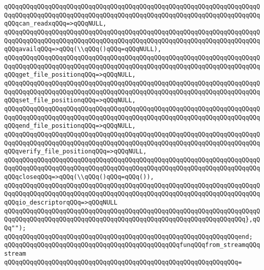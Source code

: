\verb|qQQqqQQqqQQqqQQqqQQqqQQqqQQqqQQqqQQqqQQqqQQqqQQqqQQqqQQqqQQqqQQqqQQqqQQqqQQqqQQqqQQqqQQqqQQqqQQqqQQqqQQqqQQqqQQqqQQqqQQqqQQqqQQqqQQqqQQqqQQqqQQqcan_readxqQQq=>qQQqNULL,|\newline
\verb|qQQqqQQqqQQqqQQqqQQqqQQqqQQqqQQqqQQqqQQqqQQqqQQqqQQqqQQqqQQqqQQqqQQqqQQqqQQqqQQqqQQqqQQqqQQqqQQqqQQqqQQqqQQqqQQqqQQqqQQqqQQqqQQqqQQqqQQqqQQqqQQqavailqQQq=>qQQq(\\qQQq()qQQq=qQQqNULL),|\newline
\verb|qQQqqQQqqQQqqQQqqQQqqQQqqQQqqQQqqQQqqQQqqQQqqQQqqQQqqQQqqQQqqQQqqQQqqQQqqQQqqQQqqQQqqQQqqQQqqQQqqQQqqQQqqQQqqQQqqQQqqQQqqQQqqQQqqQQqqQQqqQQqqQQqget_file_positionqQQq=>qQQqNULL,|\newline
\verb|qQQqqQQqqQQqqQQqqQQqqQQqqQQqqQQqqQQqqQQqqQQqqQQqqQQqqQQqqQQqqQQqqQQqqQQqqQQqqQQqqQQqqQQqqQQqqQQqqQQqqQQqqQQqqQQqqQQqqQQqqQQqqQQqqQQqqQQqqQQqqQQqset_file_positionqQQq=>qQQqNULL,|\newline
\verb|qQQqqQQqqQQqqQQqqQQqqQQqqQQqqQQqqQQqqQQqqQQqqQQqqQQqqQQqqQQqqQQqqQQqqQQqqQQqqQQqqQQqqQQqqQQqqQQqqQQqqQQqqQQqqQQqqQQqqQQqqQQqqQQqqQQqqQQqqQQqqQQqend_file_positionqQQq=>qQQqNULL,|\newline
\verb|qQQqqQQqqQQqqQQqqQQqqQQqqQQqqQQqqQQqqQQqqQQqqQQqqQQqqQQqqQQqqQQqqQQqqQQqqQQqqQQqqQQqqQQqqQQqqQQqqQQqqQQqqQQqqQQqqQQqqQQqqQQqqQQqqQQqqQQqqQQqqQQqverify_file_positionqQQq=>qQQqNULL,|\newline
\verb|qQQqqQQqqQQqqQQqqQQqqQQqqQQqqQQqqQQqqQQqqQQqqQQqqQQqqQQqqQQqqQQqqQQqqQQqqQQqqQQqqQQqqQQqqQQqqQQqqQQqqQQqqQQqqQQqqQQqqQQqqQQqqQQqqQQqqQQqqQQqqQQqcloseqQQq=>qQQq(\\qQQq()qQQq=qQQq()),|\newline
\verb|qQQqqQQqqQQqqQQqqQQqqQQqqQQqqQQqqQQqqQQqqQQqqQQqqQQqqQQqqQQqqQQqqQQqqQQqqQQqqQQqqQQqqQQqqQQqqQQqqQQqqQQqqQQqqQQqqQQqqQQqqQQqqQQqqQQqqQQqqQQqqQQqio_descriptorqQQq=>qQQqNULL|\newline
\verb|qQQqqQQqqQQqqQQqqQQqqQQqqQQqqQQqqQQqqQQqqQQqqQQqqQQqqQQqqQQqqQQqqQQqqQQqqQQqqQQqqQQqqQQqqQQqqQQqqQQqqQQqqQQqqQQqqQQqqQQqqQQqqQQqqQQqqQQq},qQQq"");|\newline
\newline
\verb|qQQqqQQqqQQqqQQqqQQqqQQqqQQqqQQqqQQqqQQqqQQqqQQqqQQqqQQqqQQqqQQqend;|\newline
\newline
\verb|qQQqqQQqqQQqqQQqqQQqqQQqqQQqqQQqqQQqqQQqqQQqqQQqfunqQQqfrom_streamqQQqstream|\newline
\verb|qQQqqQQqqQQqqQQqqQQqqQQqqQQqqQQqqQQqqQQqqQQqqQQqqQQqqQQqqQQqqQQq=|\newline
